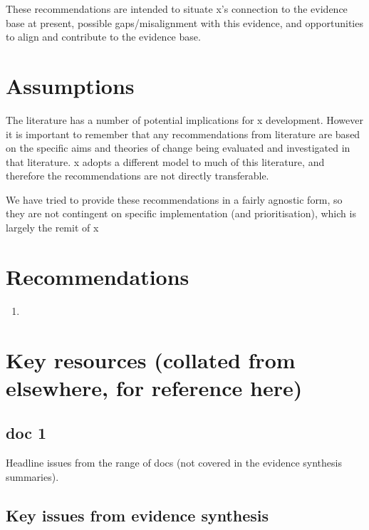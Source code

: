 \documentclass[
]{book}
\providecommand{\tightlist}{%
  \setlength{\itemsep}{0pt}\setlength{\parskip}{0pt}}
\begin{document}
These recommendations are intended to situate x's connection to the evidence base at present, possible gaps/misalignment with this evidence, and opportunities to align and contribute to the evidence base.

\hypertarget{assumptions}{%
\section{Assumptions}\label{assumptions}}

The literature has a number of potential implications for x development. However it is important to remember that any recommendations from literature are based on the specific aims and theories of change being evaluated and investigated in that literature. x adopts a different model to much of this literature, and therefore the recommendations are not directly transferable.

We have tried to provide these recommendations in a fairly agnostic form, so they are not contingent on specific implementation (and prioritisation), which is largely the remit of x

\hypertarget{recommendations}{%
\section{Recommendations}\label{recommendations}}

\begin{enumerate}
\def\labelenumi{\arabic{enumi}.}
\tightlist
\item
\end{enumerate}

\hypertarget{key-resources-collated-from-elsewhere-for-reference-here}{%
\section{Key resources (collated from elsewhere, for reference here)}\label{key-resources-collated-from-elsewhere-for-reference-here}}

\hypertarget{doc-1}{%
\subsection{doc 1}\label{doc-1}}

Headline issues from the range of docs (not covered in the evidence synthesis summaries).

\hypertarget{key-issues-from-evidence-synthesis}{%
\subsection{Key issues from evidence synthesis}\label{key-issues-from-evidence-synthesis}}
\end{document}
